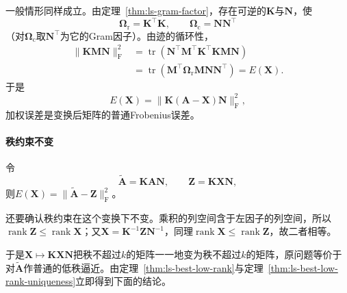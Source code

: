 一般情形同样成立。由定理~\ref{thm:ls-gram-factor}，存在可逆的$\bm K$与$\bm N$，使
\[
 \bm\Omega_{\mathrm r}=\bm K^\top\bm K,\qquad \bm\Omega_{\mathrm c}=\bm N\bm N^\top
\]
（对$\bm\Omega_{\mathrm c}$取$\bm N^\top$为它的Gram因子）。由迹的循环性，
\[
 \begin{aligned}
 \lVert\bm K\bm M\bm N\rVert_{\mathrm F}^2
 &=\operatorname{tr}(\bm N^\top\bm M^\top\bm K^\top\bm K\bm M\bm N)\\
 &=\operatorname{tr}(\bm M^\top\bm\Omega_{\mathrm r}\bm M\bm N\bm N^\top)
 =E(\bm X).
 \end{aligned}
\]
于是
\begin{equation}
 E(\bm X)=\lVert\bm K(\bm A-\bm X)\bm N\rVert_{\mathrm F}^2 ,
 \label{eq:matrix-approximation-weighted-frobenius}
\end{equation}
加权误差是变换后矩阵的普通Frobenius误差。

\paragraph{秩约束不变}
令
\begin{equation}
 \widetilde{\bm A}=\bm K\bm A\bm N,\qquad \bm Z=\bm K\bm X\bm N,
 \label{eq:matrix-approximation-weighted-transform}
\end{equation}
则$E(\bm X)=\lVert\widetilde{\bm A}-\bm Z\rVert_{\mathrm F}^2$。

还要确认秩约束在这个变换下不变。乘积的列空间含于左因子的列空间，所以$\operatorname{rank}\bm Z\leq\operatorname{rank}\bm X$；又$\bm X=\bm K^{-1}\bm Z\bm N^{-1}$，同理$\operatorname{rank}\bm X\leq\operatorname{rank}\bm Z$，故二者相等。

于是$\bm X\mapsto\bm K\bm X\bm N$把秩不超过$k$的矩阵一一地变为秩不超过$k$的矩阵，原问题等价于对$\widetilde{\bm A}$作普通的低秩逼近。由定理~\ref{thm:ls-best-low-rank}与定理~\ref{thm:ls-best-low-rank-uniqueness}立即得到下面的结论。

